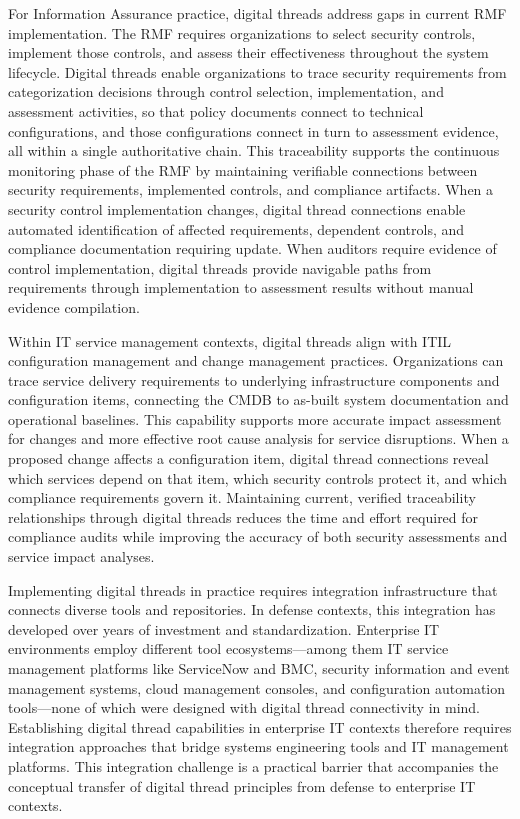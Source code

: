 For Information Assurance practice, digital threads address gaps in current RMF implementation. The RMF requires organizations to select security controls, implement those controls, and assess their effectiveness throughout the system lifecycle. Digital threads enable organizations to trace security requirements from categorization decisions through control selection, implementation, and assessment activities, so that policy documents connect to technical configurations, and those configurations connect in turn to assessment evidence, all within a single authoritative chain. This traceability supports the continuous monitoring phase of the RMF by maintaining verifiable connections between security requirements, implemented controls, and compliance artifacts. When a security control implementation changes, digital thread connections enable automated identification of affected requirements, dependent controls, and compliance documentation requiring update. When auditors require evidence of control implementation, digital threads provide navigable paths from requirements through implementation to assessment results without manual evidence compilation.

Within IT service management contexts, digital threads align with ITIL configuration management and change management practices. Organizations can trace service delivery requirements to underlying infrastructure components and configuration items, connecting the CMDB to as-built system documentation and operational baselines. This capability supports more accurate impact assessment for changes and more effective root cause analysis for service disruptions. When a proposed change affects a configuration item, digital thread connections reveal which services depend on that item, which security controls protect it, and which compliance requirements govern it. Maintaining current, verified traceability relationships through digital threads reduces the time and effort required for compliance audits while improving the accuracy of both security assessments and service impact analyses.

Implementing digital threads in practice requires integration infrastructure that connects diverse tools and repositories. In defense contexts, this integration has developed over years of investment and standardization. Enterprise IT environments employ different tool ecosystems---among them IT service management platforms like ServiceNow and BMC, security information and event management systems, cloud management consoles, and configuration automation tools---none of which were designed with digital thread connectivity in mind. Establishing digital thread capabilities in enterprise IT contexts therefore requires integration approaches that bridge systems engineering tools and IT management platforms. This integration challenge is a practical barrier that accompanies the conceptual transfer of digital thread principles from defense to enterprise IT contexts.

